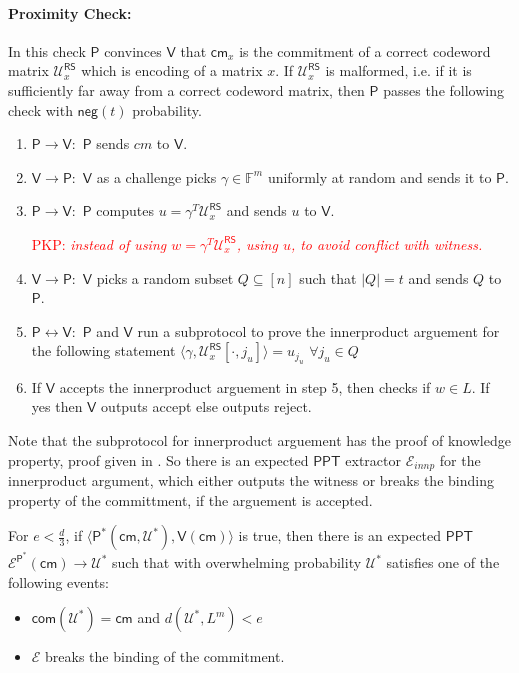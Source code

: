 \documentclass[runningheads]{llncs}
\newcommand{\innp}[2]{\langle #1,#2\rangle}
\newcommand{\pnote}[1] {\textcolor{red}  {PKP: \sl{#1}}}
\def\ppt{\mathsf{PPT}}
\def\extrac{\mathcal{E}} %
\def\prover{\mathsf{P}}
\def\verifier{\mathsf{V}}
\def\RS{\mathsf{RS}} %
\def\cm{\mathsf{cm}} %
\def\com{\mathsf{com}} %
\def\negl{\mathsf{neg}}
\def\oracle{\mathcal{U}^{\RS}}
\def\calU{\mathcal{U}}
\def\bbF{\mathbb{F}}
\begin{document}
	\paragraph{\textbf{Proximity Check:}}\label{sec:proximity} In this check $\prover$ convinces $\verifier$ that $\cm_x$ is the commitment of a correct codeword matrix $\oracle_x$ which is encoding of a matrix $x$. If $\oracle_x$ is malformed, i.e. if it is sufficiently far away from a correct codeword matrix, then $\prover$ passes the following check with $\negl(t)$ probability.
	\begin{enumerate}
		\item $\prover \rightarrow \verifier :$ $\prover$ sends $cm$ to $\verifier$.
		
		\item $\verifier \rightarrow \prover :$ $\verifier$ as a challenge picks $\gamma \in \bbF^m$ uniformly at random and sends it to $\prover$.
		
		\item $\prover \rightarrow \verifier :$ $\prover$ computes $u=\gamma^T\oracle_x$ and sends $u$ to $\verifier$.
		
		\pnote{ instead of using $w = \gamma^T \oracle_{x}$, using $u$, to avoid conflict with witness.}
		\item $\verifier \rightarrow \prover :$ $\verifier$ picks a random subset $Q\subseteq [n]$ such that $|Q|=t$ and sends $Q$ to $\prover$.
		
		\item $\prover \leftrightarrow \verifier: $ $\prover$ and $\verifier$ run a subprotocol to prove the innerproduct arguement for the following statement $\innp{\gamma}{\oracle_x[\cdot,j_u]}=u_{j_u}$ $\forall j_u\in Q$
		
		\item If $\verifier$ accepts the innerproduct arguement in step 5, then checks if $w\in L$. If yes then $\verifier$ outputs accept else outputs reject.
	\end{enumerate}
	
	Note that the subprotocol for innerproduct arguement has the proof of knowledge property, proof given in \cite{Bulletproofs}. So there is an expected $\ppt$ extractor $\extrac_{innp}$ for the innerproduct argument, which either outputs the witness or breaks the binding property of the committment, if the arguement is accepted.
	\begin{theorem}\label{theo:1}
		For $e < \frac{d}{3} $, if $\innp{\prover^*(\cm, \calU^*)}{\verifier(\cm)} $ is true, then there is an expected $\ppt$ $\extrac^{\prover^*}(\cm) \rightarrow \calU^*$ such that with overwhelming probability $\calU^*$ satisfies one of the following events: 
		\begin{itemize}
			\item $\com(\calU^*) = \cm$ and $ d(\calU^*, L^m) < e$
			\item $\extrac$ breaks the binding of the commitment. 
		\end{itemize} 
		
	\end{theorem}
\end{document}

